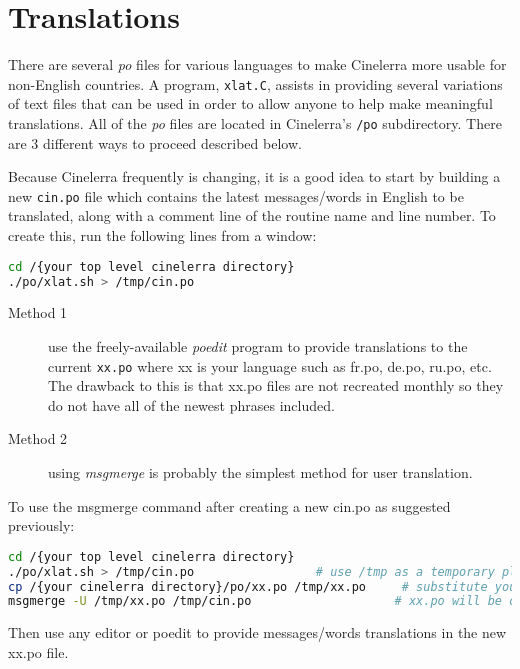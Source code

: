 \chapter{Translations}%
\label{cha:translations}

There are several \textit{po} files for various languages to make Cinelerra more usable for non-English countries.  A program, \texttt{xlat.C}, assists in providing several variations of text files that can be used in order to allow anyone to help make meaningful translations.  All of the \textit{po} files are located in Cinelerra’s \texttt{/po} subdirectory. There are 3 different ways to proceed described below.

Because Cinelerra frequently is changing, it is a good idea to start by building a new \texttt{cin.po} file which contains the latest messages/words in English to be translated, along with a comment line of the routine name and line number.  To create this, run the following lines from a window:

\begin{lstlisting}[language=bash,numbers=none]
cd /{your top level cinelerra directory}
./po/xlat.sh > /tmp/cin.po
\end{lstlisting}

\begin{description}
	\item[Method 1]  use the freely-available \textit{poedit} program to provide translations to the current \texttt{xx.po} where xx is your language such as fr.po, de.po, ru.po, etc.  The drawback to this is that xx.po files are not recreated monthly so they do not have all of the newest phrases included.
	\item[Method 2] using \textit{msgmerge} is probably the simplest method for user translation.
\end{description}

To use the msgmerge command after creating a new cin.po as suggested previously:

\begin{lstlisting}[language=bash,numbers=none]
cd /{your top level cinelerra directory}
./po/xlat.sh > /tmp/cin.po			       # use /tmp as a temporary place
cp /{your cinelerra directory}/po/xx.po /tmp/xx.po     # substitute your language for x
msgmerge -U /tmp/xx.po /tmp/cin.po                    # xx.po will be overwritten to include updates
\end{lstlisting}

Then use any editor or poedit to provide messages/words translations in the new xx.po file.

